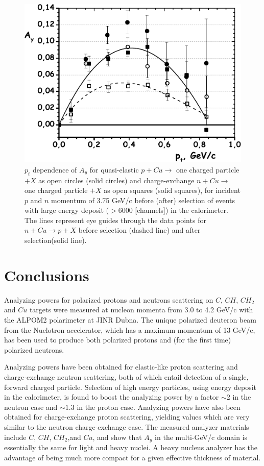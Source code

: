 \documentclass[twocolumn,epjc3]{svjour3}
\begin{document}
\begin{figure}
  \centering
  \includegraphics[width=1.00\columnwidth]{fig19_p_n_Cu_hadcal.pdf}
  \caption{$p_t$ dependence of $A_y$ for quasi-elastic $p+Cu\to$ one charged particle $+X$ as open circles (solid circles) and charge-exchange $n+Cu\to$ one charged particle $+X$ as open squares (solid squares), for incident $p$ and $n$ momentum of 3.75 GeV/c before (after) selection of events with large energy deposit ($>6000$ [channels]) in the calorimeter. The lines represent eye guides through the data points for $n+Cu \to p+X$ before selection (dashed line) and after selection(solid line).}
  \label{Fig:p_n_Cu}
\end{figure}

\section{Conclusions}
Analyzing powers for polarized protons and neutrons scattering on $C$, $CH$, $CH_2$ and $Cu$ targets were measured at nucleon momenta from 3.0 to 4.2 GeV/c with the ALPOM2 polarimeter at JINR Dubna. The unique polarized deuteron beam from the Nuclotron accelerator, which has a maximum momentum of 13 GeV/c, has been used to produce both polarized protons and (for the first time) polarized neutrons.

Analyzing powers have been obtained for elastic-like proton scattering and charge-exchange neutron scattering, both of which entail detection of a single, forward charged particle. Selection of high energy particles, using energy deposit in the calorimeter, is found to boost the analyzing power by a factor $\sim 2$ in the neutron case and $\sim 1.3$ in the proton case.  Analyzing powers have also been obtained for charge-exchange proton scattering, yielding values which are very similar to the neutron charge-exchange case.  The measured analyzer materials include $C$, $CH$, $CH_2$,and $Cu$, and show that $A_y$ in the multi-GeV/c domain is essentially the same for light and heavy nuclei. A heavy nucleus analyzer has the advantage of being much more compact for a given effective thickness of material.
\end{document}
